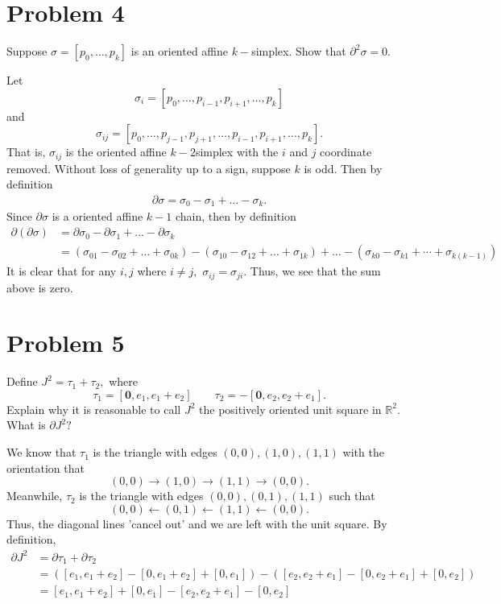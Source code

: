 \documentclass[11pt]{article}
\newcommand{\bbR}{\mathbb{R}}
\begin{document}
\section*{Problem 4}
\begin{problem}
    Suppose $\sigma = [p_0, \dots, p_k]$ is an oriented affine $k-$simplex. Show that $\partial^2 \sigma = 0.$
\end{problem}
\begin{solution}
    Let \[\sigma_i = [p_0, \dots, p_{i-1}, p_{i+1}, \dots, p_k]\] and \[\sigma_{ij} = [p_0, \dots, p_{j-1}, p_{j+1}, \dots, p_{i-1}, p_{i+1}, \dots, p_k].\] That is, $\sigma_{ij}$ is the oriented affine $k-2$simplex with the $i$ and $j$ coordinate removed. Without loss of generality up to a sign, suppose $k$ is odd. Then by definition 
    \begin{align*}
        \partial \sigma = \sigma_0 - \sigma_1 + \dots - \sigma_k.
    \end{align*}
    Since $\partial\sigma$ is a oriented affine $k-1$ chain, then by definition
    \begin{align*}
        \partial(\partial \sigma) &= \partial\sigma_0 - \partial\sigma_1 + \dots - \partial \sigma_k\\
        &= (\sigma_{01} - \sigma_{02} + \dots +\sigma_{0k})- (\sigma_{10} - \sigma_{12} + \dots + \sigma_{1k}) + \dots -(\sigma_{k0} - \sigma_{k1} + \cdots + \sigma_{k(k-1)})
    \end{align*}
    It is clear that for any $i, j$ where $i\neq j,$ $\sigma_{ij} = \sigma_{ji}.$ Thus, we see that the sum above is zero.
\end{solution}

\newpage
\section*{Problem 5}
\begin{problem}
    Define $J^2 = \tau_1 + \tau_2,$ where
    \[\tau_1 = [\textbf{0}, e_1, e_1 + e_2] \qquad \tau_2 = -[\textbf{0}, e_2, e_2 + e_1].\] Explain why it is reasonable to call $J^2$ the positively oriented unit square in $\bbR^2.$ What is $\partial J^2?$ 
\end{problem}
\begin{solution}
    We know that $\tau_1$ is the triangle with edges $(0,0), (1,0), (1,1)$ with the orientation that 
    \[(0,0)\to (1,0)\to (1,1)\to (0,0).\] Meanwhile, $\tau_2$ is the triangle with edges $(0,0), (0,1), (1,1)$ such that 
    \[(0,0)\leftarrow(0,1)\leftarrow(1,1)\leftarrow(0,0).\] Thus, the diagonal lines 'cancel out' and we are left with the unit square. By definition, 
    \begin{align*}
        \partial J^2 &= \partial \tau_1 + \partial \tau _2\\ &= ([e_1, e_1 + e_2] - [0, e_1 + e_2] + [0, e_1]) - ([e_2, e_2 + e_1]- [0, e_2 + e_1] + [0, e_2])\\
        &= [e_1, e_1 + e_2] +[0, e_1] - [e_2, e_2 + e_1] - [0,e_2]
    \end{align*}
\end{solution}
\end{document}

